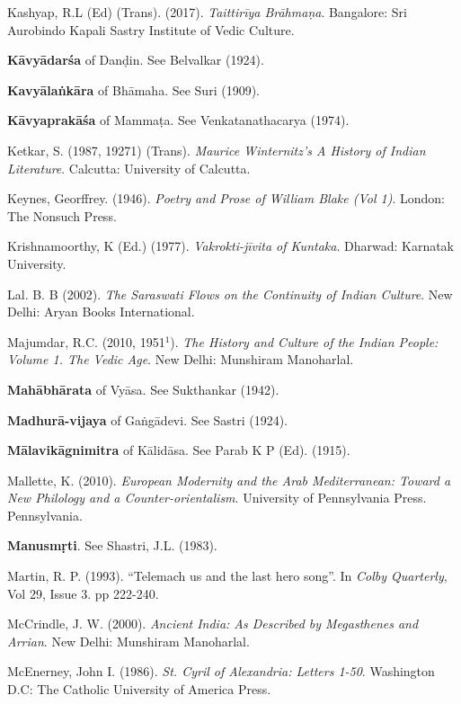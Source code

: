 \begin{thebibliography}{99}
Kashyap, R.L (Ed) (Trans). (2017). {\sl Taittirīya Brāhmaṇa}. Bangalore: Sri Aurobindo Kapali Sastry Institute of Vedic Culture. 

{\bf Kāvyādarśa} of Danḍin. See Belvalkar (1924).  

{\bf Kavyālaṅkāra} of Bhāmaha. See Suri (1909).

{\bf Kāvyaprakāśa} of Mammaṭa. See Venkatanathacarya (1974).

Ketkar, S. (1987, 19271) (Trans). {\sl Maurice Winternitz’s A History of Indian Literature}. Calcutta: University of Calcutta. 

Keynes, Georffrey. (1946). {\sl Poetry and Prose of William Blake (Vol 1)}. London: The Nonsuch Press. 

Krishnamoorthy, K (Ed.) (1977). {\sl Vakrokti-jīvita of Kuntaka}. Dharwad: Karnatak University. 

Lal. B. B (2002). {\sl The Saraswati Flows on the Continuity of Indian Culture}. New Delhi: Aryan Books International. 


Majumdar, R.C. (2010, 1951$^{1}$). {\sl The History and Culture of the Indian People: Volume 1. The Vedic Age}. New Delhi: Munshiram Manoharlal. 

{\bf Mahābhārata} of Vyāsa. See Sukthankar (1942).

{\bf Madhurā-vijaya} of Gaṅgādevi. See Sastri (1924).

{\bf Mālavikāgnimitra} of Kālidāsa. See Parab K P (Ed). (1915).

Mallette, K. (2010). {\sl European Modernity and the Arab Mediterranean: Toward a New Philology and a Counter-orientalism}. University of Pennsylvania Press. Pennsylvania.

{\bf Manusmṛti}. See Shastri, J.L. (1983).

Martin, R. P. (1993). “Telemach us and the last hero song”. In {\sl Colby Quarterly}, Vol 29, Issue 3. pp 222-240.

McCrindle, J. W. (2000). {\sl Ancient India: As Described by Megasthenes and Arrian}. New Delhi: Munshiram Manoharlal. 

McEnerney, John I. (1986). {\sl St. Cyril of Alexandria: Letters 1-50}. Washington D.C: The Catholic University of America Press. 


\end{thebibliography}
